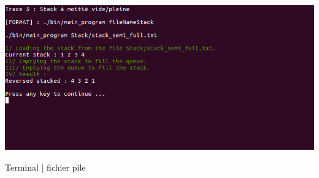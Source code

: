 \documentclass[a4paper]{article}
\begin{document}
\begin{center}
\includegraphics[scale=0.4]{trace5.png}

Terminal | fichier pile
\end{center}
\end{document}
